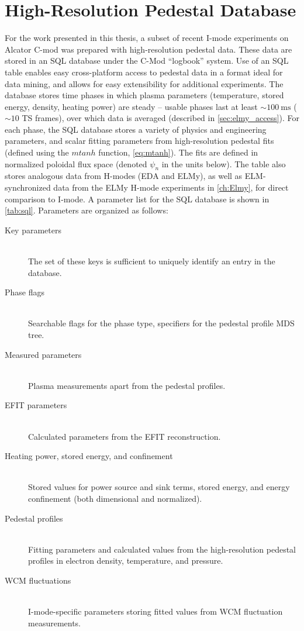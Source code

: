 \chapter{High-Resolution Pedestal Database}\label{app:sql}

For the work presented in this thesis, a subset of recent I-mode experiments on Alcator C-mod was prepared with high-resolution pedestal data.  These data are stored in an SQL database under the C-Mod ``logbook'' system.  Use of an SQL table enables easy cross-platform access to pedestal data in a format ideal for data mining, and allows for easy extensibility for additional experiments.  The database stores time phases in which plasma parameters (\eg temperature, stored energy, density, heating power) are steady -- usable phases last at least $\sim \SI{100}{\milli\second}$ ($\sim 10$ TS frames), over which data is averaged (described in \cref{sec:elmy_access}).  For each phase, the SQL database stores a variety of physics and engineering parameters, and scalar fitting parameters from high-resolution pedestal fits (defined using the $mtanh$ function, \cref{eq:mtanh}).  The fits are defined in normalized poloidal flux space (denoted $\psi_n$ in the units below).  The table also stores analogous data from H-modes (EDA and ELMy), as well as ELM-synchronized data from the ELMy H-mode experiments in \cref{ch:Elmy}, for direct comparison to I-mode.  A parameter list for the SQL database is shown in \cref{tab:sql}.  Parameters are organized as follows:

\begin{description}
 \item[Key parameters] \hfill \\
 The set of these keys is sufficient to uniquely identify an entry in the database.
 \item[Phase flags] \hfill \\
 Searchable flags for the phase type, specifiers for the pedestal profile MDS tree.
 \item[Measured parameters] \hfill \\
 Plasma measurements apart from the pedestal profiles.
 \item[EFIT parameters] \hfill \\
 Calculated parameters from the EFIT reconstruction.
 \item[Heating power, stored energy, and confinement] \hfill \\
 Stored values for power source and sink terms, stored energy, and energy confinement (both dimensional and normalized).
 \item[Pedestal profiles] \hfill \\
 Fitting parameters and calculated values from the high-resolution pedestal profiles in electron density, temperature, and pressure.
 \item[WCM fluctuations] \hfill \\
 I-mode-specific parameters storing fitted values from WCM fluctuation measurements.
\end{description}

